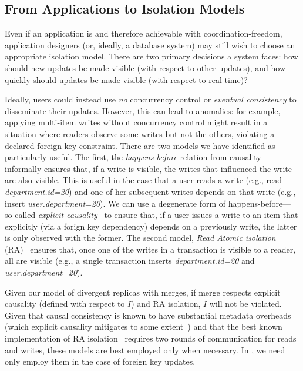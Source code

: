 \subsection{From Applications to Isolation Models}

Even if an application is \iconfluent and therefore achievable with
coordination-freedom, application designers (or, ideally, a database
system) may still wish to choose an appropriate isolation model. There
are two primary decisions a system faces: how should new updates be
made visible (with respect to other updates), and how quickly should
updates be made visible (with respect to real time)?

 Ideally, users could instead use
\textit{no} concurrency control or \textit{eventual consistency} to
disseminate their \iconfluent updates. However, this can lead to
anomalies: for example, applying multi-item writes without concurrency
control might result in a situation where readers observe some writes
but not the others, violating a declared foreign key constraint. There
are two models we have identified as particularly useful. The first,
the \textit{happens-before} relation from
causality~\cite{lamportclocks} informally ensures that, if a write is
visible, the writes that influenced the write are also visible. This
is useful in the case that a user reads a write (e.g., read
\textit{department.id=20}) and one of her subsequent writes depends on
that write (e.g., insert \textit{user.department=20}). We can use a
degenerate form of happens-before---so-called \textit{explicit
  causality}~\cite{explicit-socc2012} to ensure that, if a user issues
a write to an item that explicitly (via a forign key dependency)
depends on a previously write, the latter is only observed with the
former. The second model, \textit{Read Atomic isolation}
(RA)~\cite{ramp-txns} ensures that, once one of the writes in a
transaction is visible to a reader, all are visible (e.g., a single
transaction inserts \textit{department.id=20} and
\textit{user.department=20}).

Given our \cfree model of divergent replicas with merges, if merge
respects explicit causality (defined with respect to $I$) and RA
isolation, $I$ will not be violated. Given that causal consistency is
known to have substantial metadata overheads (which explicit causality
mitigates to some extent~\cite{explicit-socc2012}) and that the best
known implementation of RA isolation~\cite{ramp-txns} requires two
rounds of communication for reads and writes, these models are best
employed only when necessary. In \lang, we need only employ them in
the case of foreign key updates.

